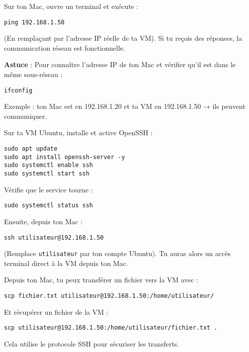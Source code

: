 \documentclass[11pt,a4paper]{article}
\begin{document}
\begin{tcolorbox}[title={3. Tester la communication depuis le Mac}]
Sur ton Mac, ouvre un terminal et exécute :  
\begin{verbatim}
ping 192.168.1.50
\end{verbatim}
(En remplaçant par l’adresse IP réelle de ta VM).  
Si tu reçois des réponses, la communication réseau est fonctionnelle.

\textbf{Astuce} : Pour connaître l’adresse IP de ton Mac et vérifier qu’il est dans le même sous-réseau :  
\begin{verbatim}
ifconfig
\end{verbatim}
Exemple : ton Mac est en 192.168.1.20 et ta VM en 192.168.1.50 → ils peuvent communiquer.
\end{tcolorbox}

\begin{tcolorbox}[title={4. Activer SSH pour accéder à la VM depuis le Mac}]
Sur ta VM Ubuntu, installe et active OpenSSH :  
\begin{verbatim}
sudo apt update
sudo apt install openssh-server -y
sudo systemctl enable ssh
sudo systemctl start ssh
\end{verbatim}

Vérifie que le service tourne :  
\begin{verbatim}
sudo systemctl status ssh
\end{verbatim}

Ensuite, depuis ton Mac :  
\begin{verbatim}
ssh utilisateur@192.168.1.50
\end{verbatim}
(Remplace \texttt{utilisateur} par ton compte Ubuntu).  
Tu auras alors un accès terminal direct à la VM depuis ton Mac.
\end{tcolorbox}

\begin{tcolorbox}[title={5. Transférer des fichiers entre Mac et VM}]
Depuis ton Mac, tu peux transférer un fichier vers la VM avec :  
\begin{verbatim}
scp fichier.txt utilisateur@192.168.1.50:/home/utilisateur/
\end{verbatim}

Et récupérer un fichier de la VM :  
\begin{verbatim}
scp utilisateur@192.168.1.50:/home/utilisateur/fichier.txt .
\end{verbatim}
Cela utilise le protocole SSH pour sécuriser les transferts.
\end{tcolorbox}
\end{document}

